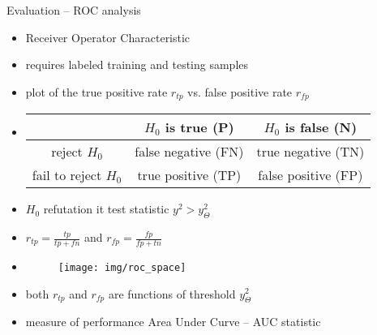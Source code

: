 \documentclass{beamer}
\begin{document}
\begin{frame}{Evaluation -- ROC analysis}


\begin{itemize}
	\item<1-5|only@1-5> Receiver Operator Characteristic
	\item<2-6,8|only@2-6,8> \alert<8>{requires labeled training and testing samples}
	\item<3-> plot of the true positive rate $r_{tp}$ vs. false positive rate $r_{fp}$
	\item<4-5|only@4-5>[]
{\small
\begin{center}
\begin{table}[h]
    \begin{center}
        \begin{tabular}{c|cc}
        	& $H_0$ is true (P)	& $H_0$ is false (N) \\ \hline
        	reject $H_0$ & false negative (FN) & true negative (TN) \\
        	fail to reject $H_0$ & true positive (TP) & false positive (FP) \\ %
        \end{tabular}
    \end{center}
    \label{tbl:hypo}
\end{table}
\end{center}
}
	\item<4-5|only@4-5>[] $H_0$ refutation it test statistic $y^2 > y^2_\Theta$
	\item<5|only@5> $r_{tp} = \frac{{tp}}{{tp}+{fn}}  $ and $r_{fp} = \frac{{fp}}{{fp}+{tn}}$
	\item<6-|only@6->[]
\begin{center}
	\begin{figure}[h] %
		\texttt{[image: img/roc\_space]}
		\label{roc_space}
	\end{figure}
\end{center}
	
	\item<6-|only@6-> both $r_{tp}$ and $r_{fp}$ are functions of threshold $y^2_\Theta$
	\item<7|only@7> measure of performance Area Under Curve -- AUC statistic
\end{itemize}

\end{frame}
\end{document}
